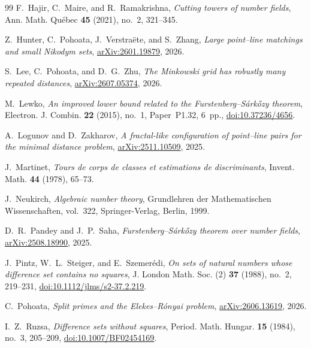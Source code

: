 \documentclass[11pt,reqno]{amsart}
\theoremstyle{definition}
\theoremstyle{remark}
\begin{document}
\begin{thebibliography}{99}
F.~Hajir, C.~Maire, and R.~Ramakrishna,
\emph{Cutting towers of number fields},
Ann. Math. Qu\'ebec \textbf{45} (2021), no.~2, 321--345.

Z.~Hunter, C.~Pohoata, J.~Verstra\"ete, and S.~Zhang,
\emph{Large point--line matchings and small {Nikodym} sets},
\href{https://arxiv.org/abs/2601.19879}{arXiv:2601.19879}, 2026.

S.~Lee, C.~Pohoata, and D.~G.~Zhu,
\emph{The {Minkowski} grid has robustly many repeated distances},
\href{https://arxiv.org/abs/2607.05374}{arXiv:2607.05374}, 2026.

M.~Lewko,
\emph{An improved lower bound related to the
{Furstenberg--S\'ark\H{o}zy} theorem},
Electron. J. Combin. \textbf{22} (2015), no.~1, Paper~P1.32, 6~pp.,
\href{https://doi.org/10.37236/4656}{doi:10.37236/4656}.

A.~Logunov and D.~Zakharov,
\emph{A fractal-like configuration of point--line pairs for the minimal distance problem},
\href{https://arxiv.org/abs/2511.10509}{arXiv:2511.10509}, 2025.

J.~Martinet,
\emph{Tours de corps de classes et estimations de discriminants},
Invent. Math. \textbf{44} (1978), 65--73.

J.~Neukirch,
\emph{Algebraic number theory},
Grundlehren der Mathematischen Wissenschaften, vol.~322,
Springer-Verlag, Berlin, 1999.


D.~R.~Pandey and J.~P.~Saha,
\emph{Furstenberg--S\'ark\H{o}zy theorem over number fields},
\href{https://arxiv.org/abs/2508.18990}{arXiv:2508.18990}, 2025.

J.~Pintz, W.~L.~Steiger, and E.~Szemer\'edi,
\emph{On sets of natural numbers whose difference set contains no squares},
J. London Math. Soc. (2) \textbf{37} (1988), no.~2, 219--231,
\href{https://doi.org/10.1112/jlms/s2-37.2.219}{doi:10.1112/jlms/s2-37.2.219}.

C.~Pohoata,
\emph{Split primes and the {Elekes--R\'onyai} problem},
\href{https://arxiv.org/abs/2606.13619}{arXiv:2606.13619}, 2026.

I.~Z.~Ruzsa,
\emph{Difference sets without squares},
Period. Math. Hungar. \textbf{15} (1984), no.~3, 205--209,
\href{https://doi.org/10.1007/BF02454169}{doi:10.1007/BF02454169}.


\end{thebibliography}
\end{document}
